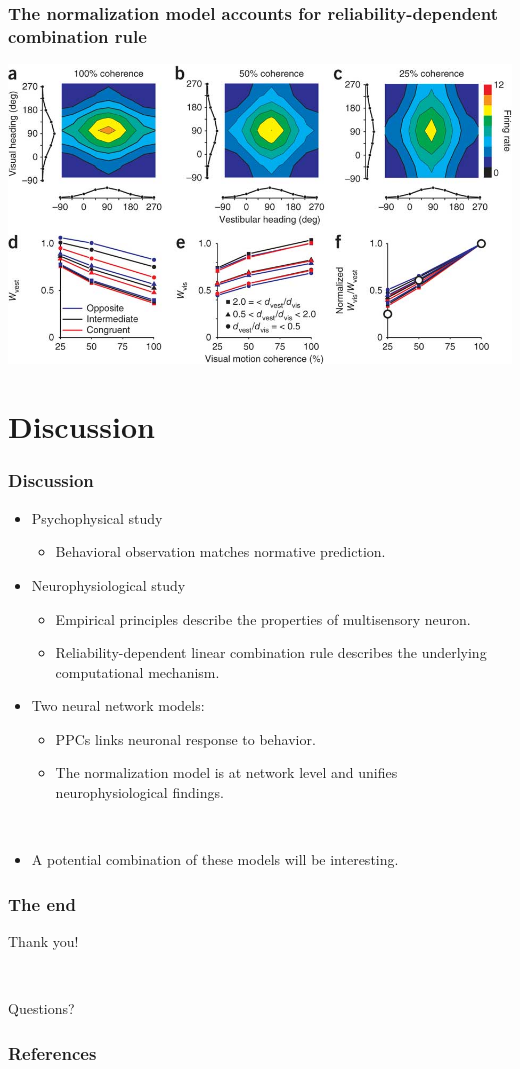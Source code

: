 \documentclass{beamer}
\begin{document}
\begin{frame}
  \frametitle{The normalization model accounts for reliability-dependent combination rule \cite{ohshiro_normalization_2011}}
  \begin{center}
    \includegraphics[width=.9\textwidth]{normweight}
  \end{center}
\end{frame}

\section{Discussion}
\begin{frame}
  \frametitle{Discussion}
  \begin{itemize}
    \item Psychophysical study
    \begin{itemize}
      \item Behavioral observation matches normative prediction.
    \end{itemize}
    \item Neurophysiological study
    \begin{itemize}
      \item Empirical principles describe the properties of multisensory neuron.
      \item Reliability-dependent linear combination rule describes the underlying computational mechanism.
    \end{itemize}
    \item Two neural network models:
    \begin{itemize}
      \item PPCs links neuronal response to behavior.
      \item The normalization model is at network level and unifies neurophysiological findings.
    \end{itemize}

    ~
    \item A potential combination of these models will be interesting.
  \end{itemize}
\end{frame}

\begin{frame}
  \frametitle{The end}
  \begin{center}
    \Huge{Thank you!}

    ~

    \Huge{Questions?}
  \end{center}
\end{frame}

\begin{frame}[allowframebreaks]
  \frametitle{References}
  {\footnotesize
  
    
  }
\end{frame}
\end{document}
